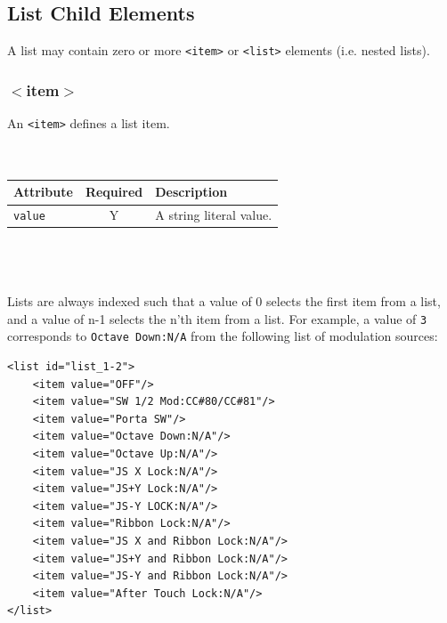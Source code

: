 \documentclass[a4paper,twoside,12pt]{article}
\newcommand{\code}[1]{\color{red}\texttt{#1}\color{black}}
\begin{document}
\subsection{List Child Elements}
A list may contain zero or more \code{<item>}{} or \code{<list>}{}
elements (i.e. nested lists).

\subsubsection{$<$item$>$}
An \code{<item>}{} defines a list item.
\\
\\
\\
\begin{tabular}{|l|c|p{9cm}|}
\hline
Attribute & Required & Description \\
\hline \code{value} & Y & A string literal value. \\
\hline
\end{tabular}
\\
\\
\\
Lists are always indexed such that a value of 0 selects the first
item from a list, and a value of n-1 selects the n'th item from a
list. For example, a value of \code{3}{} corresponds to
\code{Octave Down:N/A}{} from the following list of modulation
sources:
\begin{verbatim}
<list id="list_1-2">
    <item value="OFF"/>
    <item value="SW 1/2 Mod:CC#80/CC#81"/>
    <item value="Porta SW"/>
    <item value="Octave Down:N/A"/>
    <item value="Octave Up:N/A"/>
    <item value="JS X Lock:N/A"/>
    <item value="JS+Y Lock:N/A"/>
    <item value="JS-Y LOCK:N/A"/>
    <item value="Ribbon Lock:N/A"/>
    <item value="JS X and Ribbon Lock:N/A"/>
    <item value="JS+Y and Ribbon Lock:N/A"/>
    <item value="JS-Y and Ribbon Lock:N/A"/>
    <item value="After Touch Lock:N/A"/>
</list>
\end{verbatim}
\end{document}
